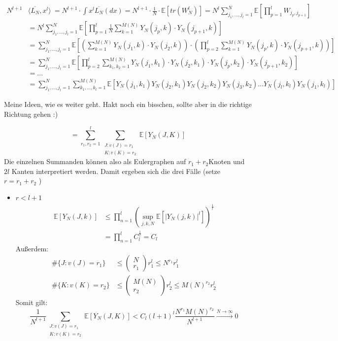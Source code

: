 \documentclass[a4paper, 11pt]{scrreprt}
\newenvironment{beweis}[1][Beweis]{\begin{trivlist}
	\item[\hskip \labelsep {\bfseries #1}]}
	{\end{trivlist}}
\newcommand{\EE}{\mathbb{E}}
\begin{document}
\newpage
\begin{beweis}
\begin{align*}
		N^{l+1} &\langle \overline{L_N}, x^l \rangle\ 
		= N^{l+1} \cdot \int x^l \overline{L_N}(dx) 
		= N^{l+1} \cdot \frac{1}{N} \cdot \EE[tr(W^l_N)] 
		= N^l \sum_{j_1,...,j_l = 1}^N \EE\left[\prod_{p = 1}^l W_{j_p,j_{p+1}}\right] \\
		&= N^l \sum_{j_1,...,j_l = 1}^N \EE\left[\prod_{p = 1}^l \frac{1}{N} \sum_{k = 1}^{M(N)} Y_N(j_p,k) \cdot Y_N(j_{p+1},k) \right] \\
		&= \sum_{j_1,...,j_l = 1}^N \EE \left[\left(\sum_{k = 1}^{M(N)} Y_N(j_1,k) \cdot Y_N(j_2,k)\right) \cdot \left(\prod_{p = 2}^l \sum_{k = 1}^{M(N)} Y_N(j_p,k) \cdot Y_N(j_{p+1},k) \right) \right] \\
		&= \sum_{j_1,...,j_l = 1}^N \EE\left[	\prod_{p = 2}^l \sum_{k_1,k_2 = 1}^{M(N)} Y_N(j_1,k_1) \cdot Y_N(j_2,k_1) \cdot Y_N(j_p,k_2) \cdot Y_N(j_{p+1},k_2) \right] \\
		&= ... \\
		&= \sum_{j_1,...,j_l = 1}^N \sum_{k_1,...,k_l = 1}^{M(N)} \EE[Y_N(j_1,k_1) Y_N(j_2,k_1) Y_N(j_2,k_2) Y_N(j_3,k_2) ... Y_N(j_l,k_l) Y_N(j_1,k_l)]
\end{align*}

Meine Ideen, wie es weiter geht. Hakt noch ein bisschen, sollte aber in die richtige Richtung gehen :)

\begin{equation}
 = \sum_{r_1,r_2 = 1}^l \sum_{\substack{J:v(J)=r_1\\ K:v(K)=r_2 }} \EE[Y_N(J,K)]
\end{equation}
Die einzelnen Summanden können also als Eulergraphen auf \(r_1+r_2 \)Knoten und \(2l\) Kanten interpretiert werden.
Damit ergeben sich die drei Fälle (setze \(r = r_1+r_2\) )
\begin{itemize}
	\item \(r < l+ 1\)\\
		\begin{align*}
			\EE[Y_N(J,k)] &\leq \prod_{n=1}^l \left(\sup_{j,k,N}\EE\left[|Y_N(j,k)|^l\right]\right)^{\frac 1 l} \\
			& = \prod_{n=1}^l C_l^{\frac 1 l} = C_l
			\end{align*}
	Außerdem: 
		\begin{align*}
			\#\{J: v(J)=r_1\} &\leq \begin{pmatrix} N \\ r_1 \end{pmatrix} r_1^l \leq N^{r_1}r_1^l \\
			\#\{K: v(K)=r_2\} &\leq \begin{pmatrix} M(N) \\ r_2 \end{pmatrix} r_2^l \leq M(N)^{r_2}r_2^l
		\end{align*}
	Somit gilt: 
		\[\frac {1}{N^{l+1}} \sum_{\substack{J:v(J)=r_1\\ K:v(K)=r_2 }} \EE[Y_N(J,K)] < C_l (l+1)^l \frac{N^{r_1} M(N)^{r_2}}{N^{l+1}} \xrightarrow{N\to\infty} 0\]
		

\end{itemize}
\end{beweis}
\end{document}
